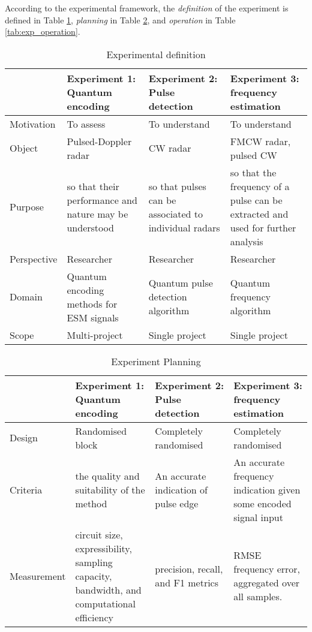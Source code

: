 According to the experimental framework, the \textit{definition} of the experiment is defined in Table \ref{tab:exp_definition}, \textit{planning} in Table \ref{tab:exp_planning}, and \textit{operation} in Table \ref{tab:exp_operation}.

\begin{table}[ht]
\caption{Experimental definition}
\label{tab:exp_definition}
\begin{tabular}{p{0.16\linewidth}|p{0.28\linewidth}p{0.28\linewidth}|p{0.28\linewidth}}
\hline
& Experiment 1: Quantum encoding & Experiment 2: Pulse detection & Experiment 3: frequency estimation \\
\hline
Motivation & To assess & To understand & To understand \\
Object & Pulsed-Doppler radar & \ac{CW} radar & \ac{FMCW} radar, pulsed \ac{CW} \\
Purpose & so that their performance and nature may be understood & so that pulses can be associated to individual radars & so that the frequency of a pulse can be extracted and used for further   analysis \\
Perspective & Researcher & Researcher & Researcher \\
Domain & Quantum encoding methods for ESM signals & Quantum pulse detection algorithm & Quantum frequency algorithm \\
Scope & Multi-project & Single project & Single project \\
\hline
\end{tabular}
\end{table}

\begin{table}[ht]
\caption{Experiment Planning}
\label{tab:exp_planning}
\begin{tabular}{p{0.16\linewidth}|p{0.28\linewidth}p{0.28\linewidth}|p{0.28\linewidth}}
\hline
& Experiment 1: Quantum encoding & Experiment 2: Pulse detection & Experiment 3: frequency estimation \\
\hline
Design & Randomised block & Completely randomised & Completely randomised \\
Criteria & the quality and suitability of the method & An accurate  indication of pulse edge & An accurate frequency indication given some encoded signal input \\
Measurement & circuit size, expressibility, sampling capacity, bandwidth, and   computational efficiency & precision, recall, and F1 metrics & \ac{RMSE} frequency error, aggregated over all samples. \\
\hline
\end{tabular}
\end{table}

